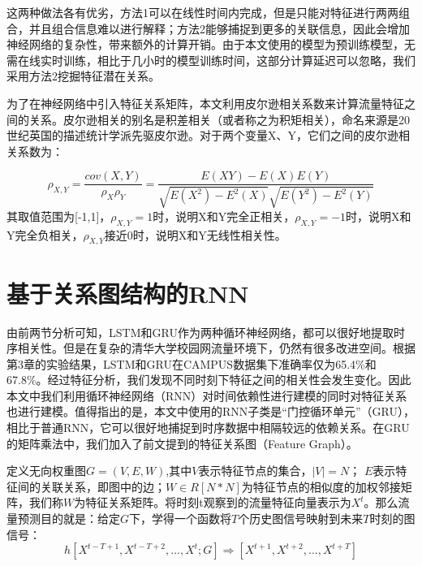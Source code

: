 这两种做法各有优劣，方法1可以在线性时间内完成，但是只能对特征进行两两组合，并且组合信息难以进行解释；方法2能够捕捉到更多的关联信息，因此会增加神经网络的复杂性，带来额外的计算开销。由于本文使用的模型为预训练模型，无需在线实时训练，相比于几小时的模型训练时间，这部分计算延迟可以忽略，我们采用方法2挖掘特征潜在关系。

为了在神经网络中引入特征关系矩阵，本文利用皮尔逊相关系数来计算流量特征之间的关系。皮尔逊相关的别名是积差相关（或者称之为积矩相关），命名来源是20 世纪英国的描述统计学派先驱皮尔逊。对于两个变量X、Y，它们之间的皮尔逊相关系数为：


\begin{equation}
  \rho_{X,Y} = \frac{cov(X,Y)}{\rho_X\rho_Y}=\frac{E(XY)-E(X)E(Y)}{\sqrt{E(X^2)-E^2(X)}\sqrt{E(Y^2)-E^2(Y)}}
\end{equation}
其取值范围为[-1,1]，$\rho_{X,Y}=1$时，说明X和Y完全正相关，$\rho_{X,Y}=-1$时，说明X和Y完全负相关，$\rho_{X,Y}$接近0时，说明X和Y无线性相关性。





\section{基于关系图结构的RNN}
由前两节分析可知，LSTM和GRU作为两种循环神经网络，都可以很好地提取时序相关性。但是在复杂的清华大学校园网流量环境下，仍然有很多改进空间。根据第3章的实验结果，LSTM和GRU在CAMPUS数据集下准确率仅为65.4\%和67.8\%。经过特征分析，我们发现不同时刻下特征之间的相关性会发生变化。因此本文中我们利用循环神经网络（RNN）对时间依赖性进行建模的同时对特征关系也进行建模。值得指出的是，本文中使用的RNN子类是“门控循环单元”（GRU），相比于普通RNN，它可以很好地捕捉到时序数据中相隔较远的依赖关系。在GRU的矩阵乘法中，我们加入了前文提到的特征关系图（Feature Graph）。

定义无向权重图$G=(V,E,W)$,其中$V$表示特征节点的集合，$|V|=N$； $E$表示特征间的关联关系，即图中的边；$W \in R[N*N]$为特征节点的相似度的加权邻接矩阵，我们称$W$为特征关系矩阵。将时刻t观察到的流量特征向量表示为$X^t$。那么流量预测目的就是：给定$G$下，学得一个函数将$T$个历史图信号映射到未来$T$时刻的图信号：
\begin{equation}
    h[X^{t-T+1}, X^{t-T+2},...,X^{t}; G] \Rightarrow [X^{t+1}, X^{t+2}, ..., X^{t+T}]
\end{equation}


